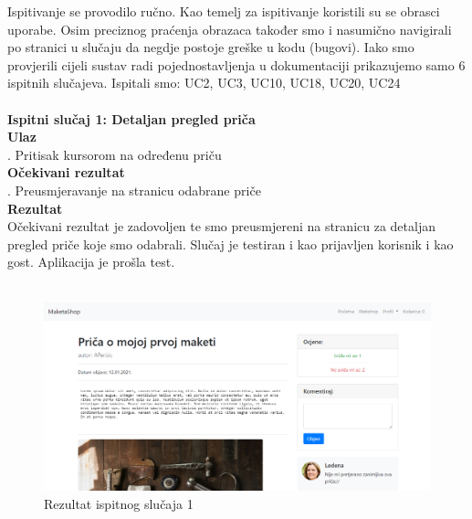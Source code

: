 {			
			Ispitivanje se provodilo ručno. Kao temelj za ispitivanje koristili su se obrasci uporabe. Osim preciznog praćenja obrazaca također smo i nasumično navigirali po stranici u slučaju da negdje postoje greške u kodu (bugovi). Iako smo provjerili cijeli sustav radi pojednostavljenja u dokumentaciji prikazujemo samo 6 ispitnih slučajeva. Ispitali smo: UC2, UC3, UC10, UC18, UC20, UC24
			\\
			\\ 
			\textbf{Ispitni slučaj 1: Detaljan pregled priča}
			\\
			\textbf{Ulaz}
			\\
			. Pritisak kursorom na određenu priču
			\\
			\textbf{Očekivani rezultat}
			\\
			. Preusmjeravanje na stranicu odabrane priče
			\\
			\textbf{Rezultat}
			\\
			\indent Očekivani rezultat je zadovoljen te smo preusmjereni na stranicu za detaljan pregled priče koje smo odabrali. Slučaj je testiran i kao prijavljen korisnik i kao gost. Aplikacija je prošla test.
			\\ \\
			\begin{figure}[H]
				\centering
				\includegraphics[scale=0.34]{"slike/test1"}
				\caption{Rezultat ispitnog slučaja 1}
				\label{fig:rezultat-ispitnog-slucaja-1}
			\end{figure}
			
}
